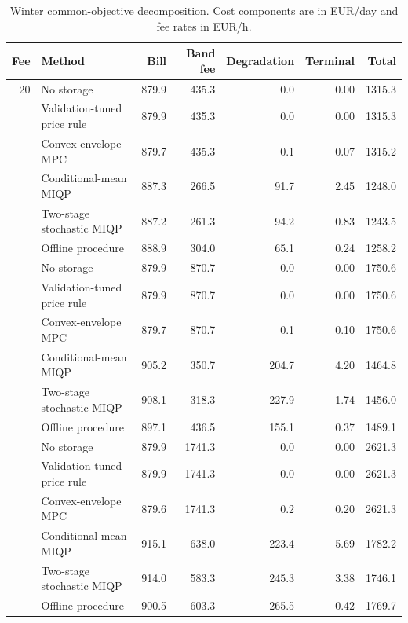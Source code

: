 \begin{table}[ht]
\centering
\scriptsize
\caption{Winter common-objective decomposition. Cost components are in EUR/day and fee rates in EUR/h.}
\label{tab:supp-components}
\begin{tabularx}{\linewidth}{r>{\raggedright\arraybackslash}Xrrrrr}
\toprule
Fee & Method & Bill & Band fee & Degradation & Terminal & Total \\
\midrule
20 & No storage & 879.9 & 435.3 & 0.0 & 0.00 & 1315.3 \\
 & Validation-tuned price rule & 879.9 & 435.3 & 0.0 & 0.00 & 1315.3 \\
 & Convex-envelope MPC & 879.7 & 435.3 & 0.1 & 0.07 & 1315.2 \\
 & Conditional-mean MIQP & 887.3 & 266.5 & 91.7 & 2.45 & 1248.0 \\
 & Two-stage stochastic MIQP & 887.2 & 261.3 & 94.2 & 0.83 & 1243.5 \\
 & Offline procedure & 888.9 & 304.0 & 65.1 & 0.24 & 1258.2 \\
\addlinespace
40 & No storage & 879.9 & 870.7 & 0.0 & 0.00 & 1750.6 \\
 & Validation-tuned price rule & 879.9 & 870.7 & 0.0 & 0.00 & 1750.6 \\
 & Convex-envelope MPC & 879.7 & 870.7 & 0.1 & 0.10 & 1750.6 \\
 & Conditional-mean MIQP & 905.2 & 350.7 & 204.7 & 4.20 & 1464.8 \\
 & Two-stage stochastic MIQP & 908.1 & 318.3 & 227.9 & 1.74 & 1456.0 \\
 & Offline procedure & 897.1 & 436.5 & 155.1 & 0.37 & 1489.1 \\
\addlinespace
80 & No storage & 879.9 & 1741.3 & 0.0 & 0.00 & 2621.3 \\
 & Validation-tuned price rule & 879.9 & 1741.3 & 0.0 & 0.00 & 2621.3 \\
 & Convex-envelope MPC & 879.6 & 1741.3 & 0.2 & 0.20 & 2621.3 \\
 & Conditional-mean MIQP & 915.1 & 638.0 & 223.4 & 5.69 & 1782.2 \\
 & Two-stage stochastic MIQP & 914.0 & 583.3 & 245.3 & 3.38 & 1746.1 \\
 & Offline procedure & 900.5 & 603.3 & 265.5 & 0.42 & 1769.7 \\
\bottomrule
\end{tabularx}
\end{table}


